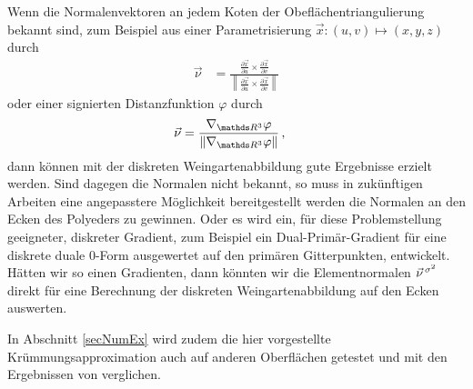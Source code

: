     \begin{fazit}
      Wenn die Normalenvektoren an jedem Koten der Obeflächentriangulierung bekannt sind, zum Beispiel aus einer Parametrisierung
      \( \vec{x}: \left( u,v \right) \mapsto \left( x,y,z \right)\) durch
      \begin{align}
        \vec{\nu} &= \frac{\frac{\partial\vec{x}}{\partial u} \times \frac{\partial\vec{x}}{\partial v}}
                             {\left\| \frac{\partial\vec{x}}{\partial u} \times \frac{\partial\vec{x}}{\partial v} \right\|}
      \end{align}
      oder einer signierten Distanzfunktion \( \varphi \) durch
      \begin{align}
        \label{eqNormalsFromSignDist}
        \vec{\nu} &= \frac{\nabla_{\R^{3}}\varphi}{\left\| \nabla_{\R^{3}}\varphi \right\|} \formkomma
      \end{align}
      dann können mit der diskreten Weingartenabbildung gute Ergebnisse erzielt werden.
      Sind dagegen die Normalen nicht bekannt, so muss in zukünftigen Arbeiten eine angepasstere Möglichkeit bereitgestellt
      werden die Normalen an den Ecken des Polyeders zu gewinnen. 
      Oder es wird ein, für diese Problemstellung geeigneter, diskreter Gradient,
      zum Beispiel ein Dual-Primär-Gradient für eine diskrete duale \( 0 \)-Form ausgewertet auf den primären Gitterpunkten, entwickelt.
      Hätten wir so einen Gradienten, dann könnten wir die Elementnormalen \( \vec{\nu}^{\,\sigma^{2}} \) direkt 
      für eine
      Berechnung der diskreten Weingartenabbildung auf den Ecken auswerten.

      In Abschnitt \ref{secNumEx} wird zudem die hier vorgestellte Krümmungsapproximation auch auf anderen Oberflächen getestet und mit den
      Ergebnissen von \cite{heine} verglichen.
    \end{fazit}



